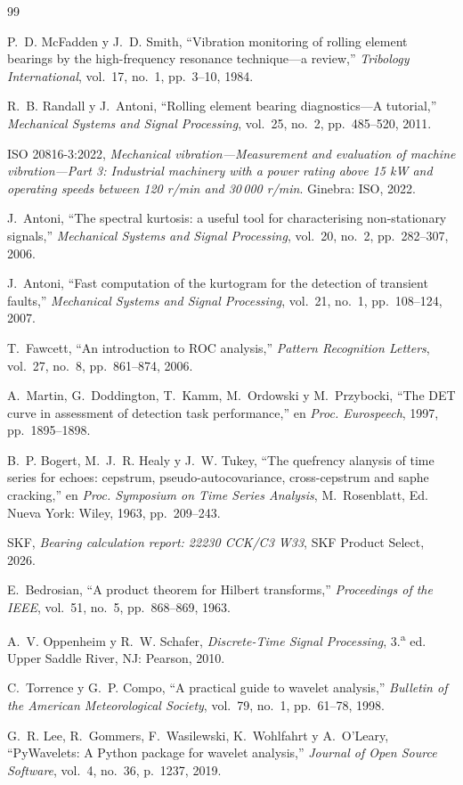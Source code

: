 \documentclass[conference,a4paper]{IEEEtran}
\begin{document}
\begin{thebibliography}{99}

P.~D. McFadden y J.~D. Smith, ``Vibration monitoring of rolling element bearings by the high-frequency resonance technique---a review,'' \emph{Tribology International}, vol.~17, no.~1, pp.~3--10, 1984.

R.~B. Randall y J.~Antoni, ``Rolling element bearing diagnostics---A tutorial,'' \emph{Mechanical Systems and Signal Processing}, vol.~25, no.~2, pp.~485--520, 2011.

ISO 20816-3:2022, \emph{Mechanical vibration---Measurement and evaluation of machine vibration---Part 3: Industrial machinery with a power rating above 15 kW and operating speeds between 120 r/min and 30\,000 r/min}. Ginebra: ISO, 2022.

J.~Antoni, ``The spectral kurtosis: a useful tool for characterising non-stationary signals,'' \emph{Mechanical Systems and Signal Processing}, vol.~20, no.~2, pp.~282--307, 2006.

J.~Antoni, ``Fast computation of the kurtogram for the detection of transient faults,'' \emph{Mechanical Systems and Signal Processing}, vol.~21, no.~1, pp.~108--124, 2007.

T.~Fawcett, ``An introduction to ROC analysis,'' \emph{Pattern Recognition Letters}, vol.~27, no.~8, pp.~861--874, 2006.

A.~Martin, G.~Doddington, T.~Kamm, M.~Ordowski y M.~Przybocki, ``The DET curve in assessment of detection task performance,'' en \emph{Proc. Eurospeech}, 1997, pp.~1895--1898.

B.~P. Bogert, M.~J.~R. Healy y J.~W. Tukey, ``The quefrency alanysis of time series for echoes: cepstrum, pseudo-autocovariance, cross-cepstrum and saphe cracking,'' en \emph{Proc. Symposium on Time Series Analysis}, M.~Rosenblatt, Ed. Nueva York: Wiley, 1963, pp.~209--243.

SKF, \emph{Bearing calculation report: 22230 CCK/C3 W33}, SKF Product Select, 2026.

E.~Bedrosian, ``A product theorem for Hilbert transforms,'' \emph{Proceedings of the IEEE}, vol.~51, no.~5, pp.~868--869, 1963.

A.~V. Oppenheim y R.~W. Schafer, \emph{Discrete-Time Signal Processing}, 3.\textsuperscript{a} ed. Upper Saddle River, NJ: Pearson, 2010.

C.~Torrence y G.~P. Compo, ``A practical guide to wavelet analysis,'' \emph{Bulletin of the American Meteorological Society}, vol.~79, no.~1, pp.~61--78, 1998.

G.~R. Lee, R.~Gommers, F.~Wasilewski, K.~Wohlfahrt y A.~O'Leary, ``PyWavelets: A Python package for wavelet analysis,'' \emph{Journal of Open Source Software}, vol.~4, no.~36, p.~1237, 2019.

\end{thebibliography}
\end{document}
